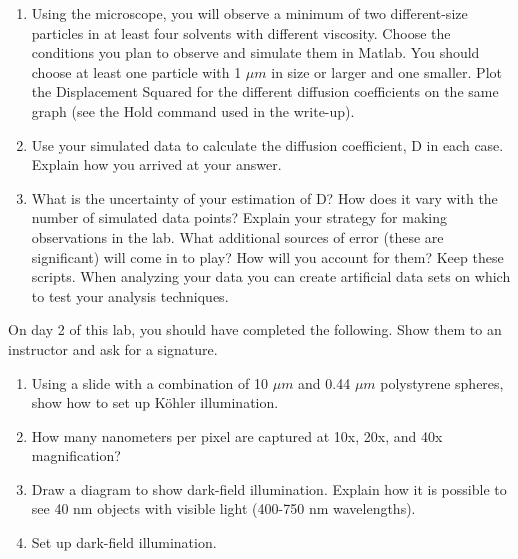 \documentclass{../signatures}
\begin{document}
\begin{enumerate}

\item Using the microscope, you will observe a minimum of two different-size particles in at least four solvents with different viscosity. Choose the conditions you plan to observe and simulate them in Matlab. You should choose at least one particle with 1 $\mu m$ in size or larger and one smaller. Plot the Displacement Squared for the different diffusion coefficients on the same graph (see the Hold command used in the write-up).

\item Use your simulated data to calculate the diffusion coefficient, D in each case. Explain how you arrived at your answer. 


\newpage

\item What is the uncertainty of your estimation of D? How does it vary with the number of simulated data points? Explain your strategy for making observations in the lab. What additional sources of error (these are significant) will come in to play? How will you account for them? Keep these scripts. When analyzing your data you can create artificial data sets on which to test your analysis techniques. 
\\[36pt]
\end{enumerate}


\midlab

On day 2 of this lab, you should have completed the following. Show them to an instructor and ask for a signature.

\begin{enumerate}

    \item Using a slide with a combination of 10 $\mu m$ and 0.44 $\mu m$ polystyrene spheres, show how to set up K\"ohler illumination.
    
    \item How many nanometers per pixel are captured at 10x, 20x, and 40x magnification?
    
    \item Draw a diagram to show dark-field illumination. Explain how it is possible to see 40 nm objects with visible light (400-750 nm wavelengths).
    
    \item Set up dark-field illumination.
\\[36pt]
\end{enumerate}
\end{document}
